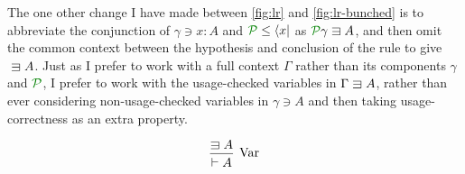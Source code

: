 The one other change I have made between \cref{fig:lr} and \cref{fig:lr-bunched}
is to abbreviate the conjunction of $\gamma \ni x : A$ and
$\grP \leq \langle x \rvert$ as $\grP\gamma \sqni A$, and then omit the common
context between the hypothesis and conclusion of the  rule to give
${} \sqni A$.
Just as I prefer to work with a full context $\Gamma$ rather than its components
$\gamma$ and $\grP$, I prefer to work with the usage-checked variables in
$\Gamma \sqni A$, rather than ever considering non-usage-checked variables in
$\gamma \ni A$ and then taking usage-correctness as an extra property.

\begin{figure}
  \begin{displaymath}
    \begin{prooftree}
      \hypo{\sqni A}
      \infer1[Var]{\vdash A}
    \end{prooftree}
  \end{displaymath}


\end{figure}
